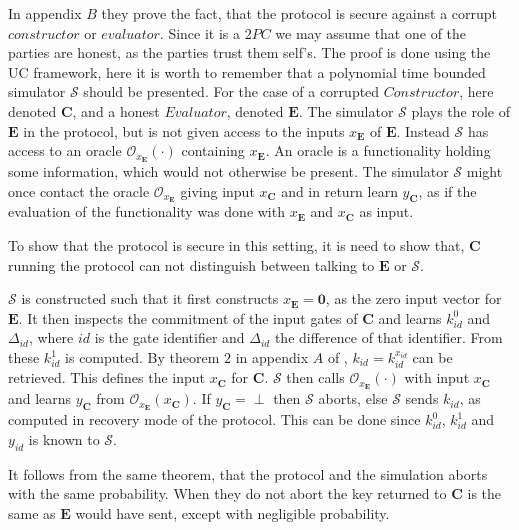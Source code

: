 \documentclass[twoside,11pt,openright]{report}
\begin{document}
\bigskip

In appendix $B$ they prove the fact, that the protocol is secure against a corrupt $constructor$ or $evaluator$. Since it is a $2PC$ we may assume that one of the parties are honest, as the parties trust them self's. The proof is done using the UC framework, here it is worth to remember that a polynomial time bounded simulator $\mathcal{S}$ should be presented. For the case of a corrupted $Constructor$, here denoted $\mathbf{C}$, and a honest $Evaluator$, denoted $\mathbf{E}$. The simulator $\mathcal{S}$ plays the role of $\mathbf{E}$ in the protocol, but is not given access to the inputs $x_{\mathbf{E}}$ of $\mathbf{E}$. Instead $\mathcal{S}$ has access to an oracle $\mathcal{O}_{x_{\mathbf{E}}}(\cdot)$ containing $x_{\mathbf{E}}$. An oracle is a functionality holding some information, which would not otherwise be present. The simulator $\mathcal{S}$ might once contact the oracle $\mathcal{O}_{x_{\mathbf{E}}}$ giving input $x_{\mathbf{C}}$ and in return learn $y_{\mathbf{C}}$, as if the evaluation of the functionality was done with $x_{\mathbf{E}}$ and $x_{\mathbf{C}}$ as input.

To show that the protocol is secure in this setting, it is need to show that, $\mathbf{C}$ running the protocol can not distinguish between talking to $\mathbf{E}$ or $\mathcal{S}$.

$\mathcal{S}$ is constructed such that it first constructs $x_\mathbf{E}=\mathbf{0}$, as the zero input vector for $\mathbf{E}$. It then inspects the commitment of the input gates of $\mathbf{C}$ and learns $k^0_{id}$ and $\Delta_{id}$, where $id$ is the gate identifier and $\Delta_{id}$ the difference of that identifier. From these $k^1_{id}$ is computed. By theorem $2$ in appendix $A$ of \cite{duplo}, $k_{id}=k^{x_{id}}_{id}$ can be retrieved. This defines the input $x_\mathbf{C}$ for $\mathbf{C}$. $\mathcal{S}$ then calls $\mathcal{O}_{x_\mathbf{E}}(\cdot)$ with input $x_\mathbf{C}$ and learns $y_\mathbf{C}$ from $\mathcal{O}_{x_{\mathbf{E}}}(x_\mathbf{C})$. If $y_\mathbf{C}=\perp$ then $\mathcal{S}$ aborts, else $\mathcal{S}$ sends $k_{id}$, as computed in recovery mode of the protocol. This can be done since $k^0_{id}$, $k^1_{id}$ and $y_{id}$ is known to $\mathcal{S}$.

It follows from the same theorem, that the protocol and the simulation aborts with the same probability. When they do not abort the key returned to $\mathbf{C}$ is the same as $\mathbf{E}$ would have sent, except with negligible probability.
\end{document}
